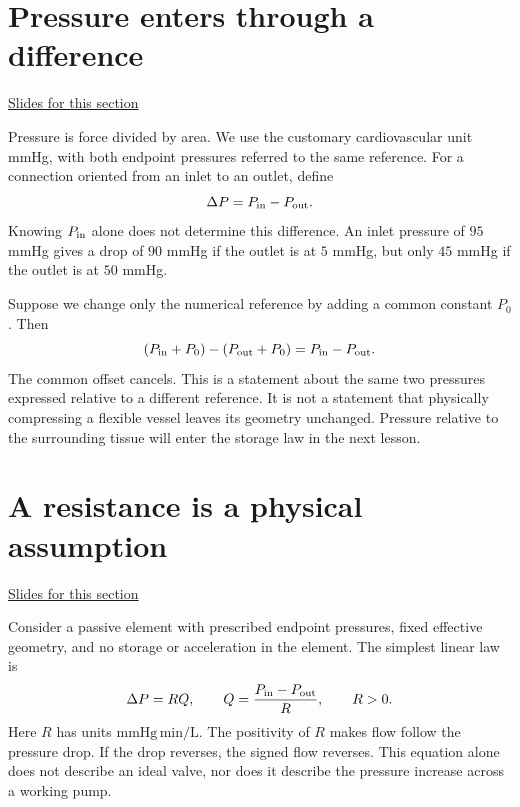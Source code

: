 \documentclass[11pt,letterpaper]{article}
\theoremstyle{definition}\newtheorem{definition}{Definition}\newtheorem{example}{Example}
\numberwithin{equation}{section}
\begin{document}
\section{Pressure enters through a difference}
\hypertarget{note-pressure-enters-through-a-difference}{}\label{note:pressure-enters-through-a-difference}
{\small \href{slides.html\#frame=the-pressure-drop\&step=1}{Slides for this section}}\par
Pressure is force divided by area. We use the customary cardiovascular unit mmHg, with both endpoint pressures referred to the same reference. For a connection oriented from an inlet to an outlet, define
\begin{equation}
\Delta P=P_{\rm in}-P_{\rm out}.
\end{equation}
Knowing $P_{\rm in}$ alone does not determine this difference. An inlet pressure of $95$ mmHg gives a drop of $90$ mmHg if the outlet is at $5$ mmHg, but only $45$ mmHg if the outlet is at $50$ mmHg.

Suppose we change only the numerical reference by adding a common constant $P_0$. Then
\[
(P_{\rm in}+P_0)-(P_{\rm out}+P_0)
=P_{\rm in}-P_{\rm out}.
\]
The common offset cancels. This is a statement about the same two pressures expressed relative to a different reference. It is not a statement that physically compressing a flexible vessel leaves its geometry unchanged. Pressure relative to the surrounding tissue will enter the storage law in the next lesson.
\section{A resistance is a physical assumption}
\hypertarget{note-a-resistance-is-a-physical-assumption}{}\label{note:a-resistance-is-a-physical-assumption}
{\small \href{slides.html\#frame=the-linear-resistance-law\&step=1}{Slides for this section}}\par
Consider a passive element with prescribed endpoint pressures, fixed effective geometry, and no storage or acceleration in the element. The simplest linear law is
\begin{equation}
\Delta P=RQ,\qquad Q=\frac{P_{\rm in}-P_{\rm out}}{R},\qquad R>0.
\end{equation}
Here $R$ has units $\mathrm{mmHg\,min/L}$. The positivity of $R$ makes flow follow the pressure drop. If the drop reverses, the signed flow reverses. This equation alone does not describe an ideal valve, nor does it describe the pressure increase across a working pump.
\end{document}
